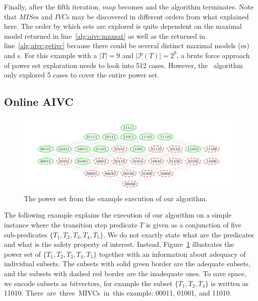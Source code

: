 Finally, after the fifth iteration, $map$ becomes \unsat and the algorithm terminates.
Note that $MIS$es and $IVC$s may be discovered in different orders from what explained here. The order by which sets are explored is
quite dependent on the maximal model returned in line~\ref{alg:aivc:maxsat} as well as the \mivc returned in line~\ref{alg:aivc:getivc} because there could be several distinct maximal models (\mis es) and \mivc s. For this example with a $|T| = 9$ and $|\mathcal{P}(T)| = 2^9$, a brute force approach of power set exploration needs to look into 512  cases. However, the \aivcalg ~algorithm only explored 5 cases to cover the entire power set. %


\subsection{Online AIVC}
\begin{figure}[t]
\centering
  \includegraphics[width=\columnwidth]{figs/growshrink.jpg}
  \vspace{-0.1in}
\caption{The power set from the example execution of our algorithm.}
\label{fig:running_cube}
\end{figure}

The following example explains the execution of our algorithm on a simple instance where the transition step predicate $T$ is given as a conjunction of five sub-predicates $\{T_1, T_2, T_3, T_4, T_5\}$. We do not exactly state what are the predicates and what is the safety property of interest. Instead, Figure~\ref{fig:running_cube} illustrates the power set of $\{T_1, T_2, T_3, T_4, T_5\}$ together with an information about adequacy of individual subsets. The subsets with solid green border are the adequate subsets, and the subsets with dashed red border are the inadequate ones. To save space, we encode subsets as bitvectors, for example the subset $\{T_1, T_2, T_4\}$ is written as 11010. There~are~three~MIVCs~in~this example: 00011, 01001, and 11010.

